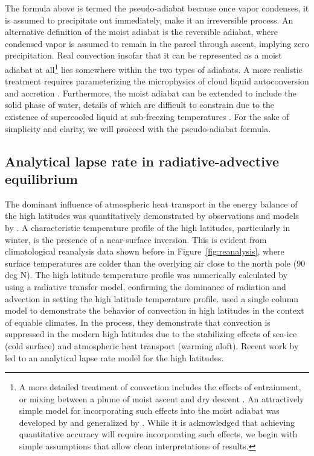 \documentclass{article}
\begin{document}
The formula above is termed the pseudo-adiabat because once vapor condenses, it is assumed to precipitate out immediately, make it an irreversible process. An alternative definition of the moist adiabat is the reversible adiabat, where condensed vapor is assumed to remain in the parcel through ascent, implying zero precipitation. Real convection insofar that it can be represented as a moist adiabat at all\footnote{A more detailed treatment of convection includes the effects of entrainment, or mixing between a plume of moist ascent and dry descent \citep{blyth-1993}. An attractively simple model for incorporating such effects into the moist adiabat was developed by \citet{singh-ogorman-2013} and generalized by \citet{romps-2014}. While it is acknowledged that achieving quantitative accuracy will require incorporating such effects, we begin with simple assumptions that allow clean interpretations of results.} lies somewhere within the two types of adiabats. A more realistic treatment requires parameterizing the microphysics of cloud liquid autoconversion and accretion \citep{emanuel-1994}. Furthermore, the moist adiabat can be extended to include the solid phase of water, details of which are difficult to constrain due to the existence of supercooled liquid at sub-freezing temperatures \citep{ooyama-1990}. For the sake of simplicity and clarity, we will proceed with the pseudo-adiabat formula.

\subsection{Analytical lapse rate in radiative-advective equilibrium}

The dominant influence of atmospheric heat transport in the energy balance of the high latitudes was quantitatively demonstrated by observations and models by \citet{nakamura-oort-1988}. A characteristic temperature profile of the high latitudes, particularly in winter, is the presence of a near-surface inversion. This is evident from climatological reanalysis data shown before in Figure~\ref{fig:reanalysis}, where surface temperatures are colder than the overlying air close to the north pole (90 deg N). The high latitude temperature profile was numerically calculated by \citet{overland-guest-1991} using a radiative transfer model, confirming the dominance of radiation and advection in setting the high latitude temperature profile. \cite{abbot-tziperman-2008} used a single column model to demonstrate the behavior of convection in high latitudes in the context of equable climates. In the process, they demonstrate that convection is suppressed in the modern high latitudes due to the stabilizing effects of sea-ice (cold surface) and atmospheric heat transport (warming aloft). Recent work by \citet{cronin-jansen-2016} led to an analytical lapse rate model for the high latitudes.
\end{document}
